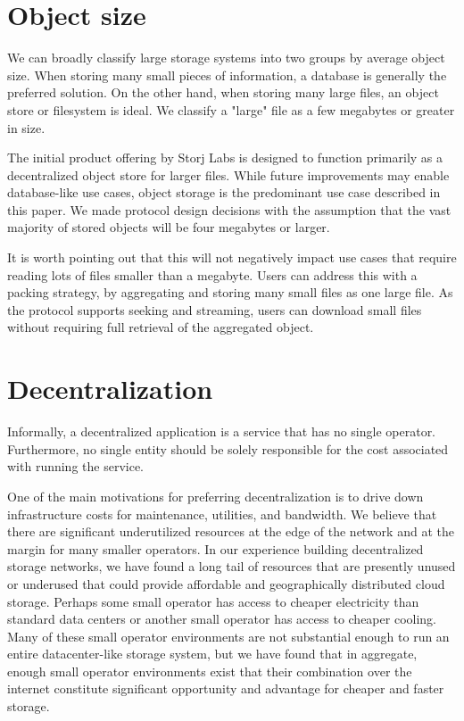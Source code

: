 \documentclass[11pt,fleqn,openany]{book}
\begin{document}
\section{Object size}

We can broadly classify large storage systems into two groups by average
object size. When storing many small pieces of information, a
database is generally the preferred solution.
On the other hand, when storing many large
files, an object store or filesystem is ideal. We classify a "large" file as a
few megabytes or greater in size.

The initial product offering by Storj Labs is designed to function primarily as
a decentralized object store for larger files.
While future improvements may enable
database-like use cases, object storage is the predominant use case described in
this paper. We made protocol design decisions with the assumption that the
vast majority of stored objects will be four megabytes or larger.

It is worth pointing out that this will not negatively impact use cases that
require reading lots of files smaller than a megabyte. Users can address this
with a packing strategy, by aggregating and storing many small files as one
large file.
As the protocol supports seeking and streaming, users can download small files
without requiring full retrieval of the aggregated object.

\section{Decentralization}

Informally, a decentralized application is a service that has no single
operator. Furthermore, no single entity should be solely responsible for the
cost associated with running the service.

One of the main motivations for preferring decentralization is to drive
down infrastructure costs for maintenance, utilities, and bandwidth.
We believe that there
are significant underutilized resources at the edge of the network and at
the margin for many smaller operators. In our experience building decentralized
storage networks, we have found a long tail of resources that are presently
unused or underused that could provide affordable and
geographically distributed cloud storage. Perhaps some small operator
has access to cheaper electricity than standard data centers or another small
operator has access to cheaper cooling. Many of these small operator
environments are not substantial enough to run an entire datacenter-like
storage system, but we have found that in aggregate, enough small operator
environments exist that their combination over the internet constitute
significant opportunity and advantage for cheaper and faster storage.
\end{document}

